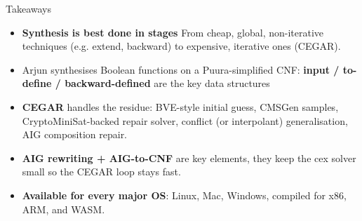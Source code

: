 \documentclass[aspectratio=169]{beamer}
\begin{document}
\begin{frame}{Takeaways}
  \begin{itemize}\setlength{\itemsep}{2pt}
    \item \textbf{Synthesis is best done in stages}  From cheap, global, non-iterative
          techniques (e.g. extend, backward) to expensive,
            iterative ones (CEGAR).
    \item Arjun synthesises Boolean functions on a Puura-simplified
        CNF: \textbf{input / to-define / backward-defined} are the key data
          structures
    \item \textbf{CEGAR} handles the residue: BVE-style initial
          guess, CMSGen samples, CryptoMiniSat-backed repair solver,
          conflict (or interpolant) generalisation, AIG composition
          repair.
    \item \textbf{AIG rewriting + AIG-to-CNF} are key elements,
          they keep the cex solver small so the CEGAR loop stays fast.
    \item \textbf{Available for every major OS}:
        Linux, Mac, Windows, compiled for x86, ARM, and WASM.
  \end{itemize}
\end{frame}
\end{document}
